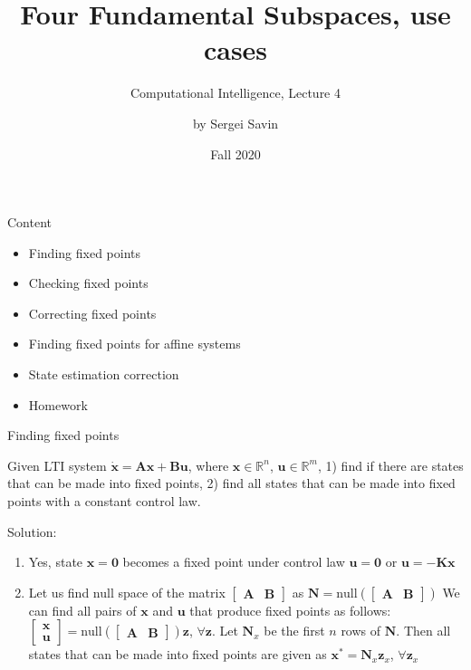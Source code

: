 \documentclass{beamer}
\title{Four Fundamental Subspaces, use cases}
\subtitle{Computational Intelligence, Lecture 4}
\author{by Sergei Savin}
\date{Fall 2020}
\begin{document}
\maketitle


\begin{frame}{Content}

\begin{itemize}
\item Finding fixed points
\item Checking fixed points
\item Correcting fixed points
\item Finding fixed points for affine systems
\item State estimation correction
\item Homework
\end{itemize}

\end{frame}



\begin{frame}{Finding fixed points}
\begin{flushleft}

Given LTI system $\dot{\mathbf{x}} = \mathbf{A} \mathbf{x} + \mathbf{B} \mathbf{u}$, where $\mathbf{x} \in \mathbb{R}^n$, $\mathbf{u} \in \mathbb{R}^m$, 1) find if there are states that can be made into fixed points, 2) find all states that can be made into fixed points with a constant control law.

\bigskip

Solution: 

\begin{enumerate}
    \item Yes, state $\mathbf{x} = \mathbf{0}$ becomes a fixed point under control law $\mathbf{u} = \mathbf{0}$ or $\mathbf{u} = -\mathbf{K}\mathbf{x}$
    \item Let us find null space of the matrix $\begin{bmatrix} \mathbf{A} & \mathbf{B} \end{bmatrix}$ as $\mathbf{N} = \text{null} (\begin{bmatrix} \mathbf{A} & \mathbf{B} \end{bmatrix})$ We can find all pairs of $\mathbf{x}$ and $\mathbf{u}$ that produce fixed points as follows: $\begin{bmatrix} \mathbf{x} \\ \mathbf{u} \end{bmatrix} = \text{null} (\begin{bmatrix} \mathbf{A} & \mathbf{B} \end{bmatrix}) \mathbf{z}$, $\forall \mathbf{z}$. Let $\mathbf{N}_x$ be the first $n$ rows of $\mathbf{N}$. Then all states that can be made into fixed points are given as $\mathbf{x}^* = \mathbf{N}_x \mathbf{z}_x$, $\forall \mathbf{z}_x$
\end{enumerate}

\end{flushleft}
\end{frame}
\end{document}
